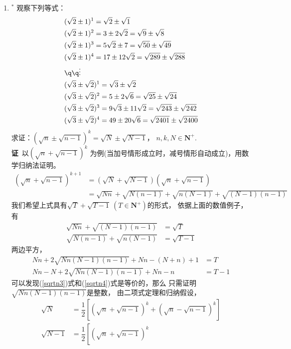 \begin{enumerate}[label={【\textbf{例\thechapter.\arabic*}】},
 leftmargin=\inteval{\myenumleftmargin}pt,
 itemsep=\inteval{\myenumitempsep}pt,
 itemindent=\inteval{\myenumitemindent}pt]
\item $^*$ 观察下列等式：
\begin{align*}
    &(\sqrt{2} \pm 1)^{1}=\sqrt{2} \pm \sqrt{1} \\
    &(\sqrt{2} \pm 1)^{2}=3 \pm 2\sqrt{2}=\sqrt{9} \pm \sqrt{8} \\
    &(\sqrt{2} \pm 1)^{3}=5\sqrt{2} \pm 7=\sqrt{50} \pm \sqrt{49} \\
    &(\sqrt{2} \pm 1)^{4}=17 \pm 12\sqrt{2}=\sqrt{289} \pm \sqrt{288} \\
    & \q\q \vdots \\
    &(\sqrt{3} \pm \sqrt{2})^{1}=\sqrt{3} \pm \sqrt{2} \\
    &(\sqrt{3} \pm \sqrt{2})^{2}=5 \pm 2\sqrt{6}=\sqrt{25} \pm \sqrt{24} \\
    &(\sqrt{3} \pm \sqrt{2})^{3}=9\sqrt{3} \pm 11\sqrt{2}=\sqrt{243} \pm 
    \sqrt{242} \\
    &(\sqrt{3} \pm \sqrt{2})^{4}=49 \pm 20\sqrt{6}=\sqrt{2401} \pm \sqrt{2400}    
\end{align*}
求证：$ (\sqrt{n}\pm\sqrt{n-1})^k=\sqrt{N}\pm\sqrt{N-1} $，
$ n,k,N\in \textbf{N}^+ $. \\
\textbf{证}\ 以$ (\sqrt{n}+\sqrt{n-1})^{k} $
为例(当加号情形成立时，减号情形自动成立)，用数学归纳法证明。
\begin{align*}
    (\sqrt{n}+\sqrt{n-1})^{k+1}&=(\sqrt{N}+\sqrt{N-1})(\sqrt{n}+\sqrt{n-1}) \\
    &=\sqrt{Nn}+\sqrt{N(n-1)}+\sqrt{n(N-1)}+\sqrt{(N-1)(n-1)}
\end{align*}
我们希望上式具有$ \sqrt{T}+\sqrt{T-1}\ (T\in \textbf{N}^+) $的形式，
依据上面的数值例子，有
\begin{align}
    \sqrt{Nn}+\sqrt{(N-1)(n-1)} &=\sqrt{T}   \label{sqrtn1} \\
    \sqrt{N(n-1)}+\sqrt{n(N-1)} &=\sqrt{T-1} \label{sqrtn2}
\end{align}
两边平方，
\begin{align}
    Nn+2\sqrt{Nn(N-1)(n-1)}+Nn-(N+n)+1 &=T   \label{sqrtn3} \\
    Nn-N+2\sqrt{Nn(N-1)(n-1)}+Nn-n     &=T-1 \label{sqrtn4}
\end{align}
可以发现(\ref{sqrtn3})式和(\ref{sqrtn4})式是等价的，那么
只需证明$ \sqrt{Nn(N-1)(n-1)} $是整数，
由二项式定理和归纳假设，
\begin{align*}
    \sqrt{N} &=\dfrac{1}{2}\left[(\sqrt{n}+\sqrt{n-1})^k
    +(\sqrt{n}-\sqrt{n-1})^k\right] \\
    \sqrt{N-1} &=\dfrac{1}{2}\left[(\sqrt{n}+\sqrt{n-1})^k

\end{align*}
\end{enumerate}

